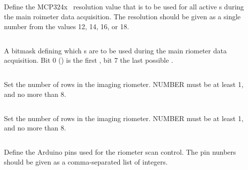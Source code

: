 \subsection[rio-riometer-adc-resolution]{}

Define the MCP324x \adc\ resolution value that is to be used for all
active \adc s during the main roimeter data acquisition. The
resolution should be given as a single number from the values 12, 14,
16, or 18.



\subsection[rio-riometer-adc-mask]{}

A bitmask defining which \adc s are to be used during the main
riometer data acquisition. Bit 0 (\lsb) is the first \adc, bit 7 the
last possible \adc.

\subsection[rio-num-rows]{}

Set the number of rows in the imaging riometer. NUMBER must be at
least 1, and no more than 8.

\subsection[rio-num-columns]{}

Set the number of rows in the imaging riometer. NUMBER must be at
least 1, and no more than 8.

\subsection[rio-scan-pins]{}
\label{sec:eeprom-rio-scan-pins}

Define the Arduino pins used for the riometer scan control. The pin nunbers
should be given as a comma-separated list of integers.

\subsection[rio-presample-delay-ms]{}

